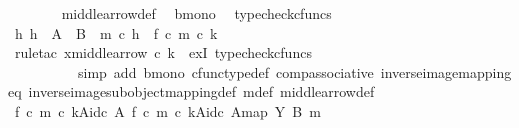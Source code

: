 \begin{isabellebody}
\ \ \ \ \ \ \isamarkupfalse%
\ middle{\isacharunderscore}{\kern0pt}arrow{\isacharunderscore}{\kern0pt}def\ \isamarkupfalse%
\ b{\isacharunderscore}{\kern0pt}mono\ \isamarkupfalse%
\ {\isacharparenleft}{\kern0pt}typecheck{\isacharunderscore}{\kern0pt}cfuncs{\isacharparenright}{\kern0pt}\isanewline
\isanewline
\ \ \ \ \isamarkupfalse%
\ {\isachardoublequoteopen}{\isasymexists}h{\isachardot}{\kern0pt}\ h\ {\isacharcolon}{\kern0pt}\ A\ {\isasymrightarrow}\ B\ {\isasymand}\ m\ {\isasymcirc}\isactrlsub c\ h\ {\isacharequal}{\kern0pt}\ f\ {\isasymcirc}\isactrlsub c\ m{\isacharprime}{\kern0pt}\ {\isasymcirc}\isactrlsub c\ k{\isachardoublequoteclose}\isanewline
\ \ \ \ \ \ \isamarkupfalse%
\ {\isacharparenleft}{\kern0pt}rule{\isacharunderscore}{\kern0pt}tac\ x{\isacharequal}{\kern0pt}{\isachardoublequoteopen}middle{\isacharunderscore}{\kern0pt}arrow\ {\isasymcirc}\isactrlsub c\ k{\isachardoublequoteclose}\ \ exI{\isacharcomma}{\kern0pt}\ typecheck{\isacharunderscore}{\kern0pt}cfuncs{\isacharcomma}{\kern0pt}\ \isanewline
\ \ \ \ \ \ \ \ \ \ simp\ add{\isacharcolon}{\kern0pt}\ b{\isacharunderscore}{\kern0pt}mono\ cfunc{\isacharunderscore}{\kern0pt}type{\isacharunderscore}{\kern0pt}def\ comp{\isacharunderscore}{\kern0pt}associative{}\ inverse{\isacharunderscore}{\kern0pt}image{\isacharunderscore}{\kern0pt}mapping{\isacharunderscore}{\kern0pt}eq\ inverse{\isacharunderscore}{\kern0pt}image{\isacharunderscore}{\kern0pt}subobject{\isacharunderscore}{\kern0pt}mapping{\isacharunderscore}{\kern0pt}def\ m{\isacharprime}{\kern0pt}{\isacharunderscore}{\kern0pt}def\ middle{\isacharunderscore}{\kern0pt}arrow{\isacharunderscore}{\kern0pt}def{\isacharparenright}{\kern0pt}\isanewline
\ \ \isamarkupfalse%
\isanewline
\isanewline
\ \ \isamarkupfalse%
\ \isamarkupfalse%
\ {\isachardoublequoteopen}{\isacharparenleft}{\kern0pt}{\isacharparenleft}{\kern0pt}f\ {\isasymcirc}\isactrlsub c\ m{\isacharprime}{\kern0pt}\ {\isasymcirc}\isactrlsub c\ k{\isacharparenright}{\kern0pt}{\isasymlparr}A{\isasymrparr}\isactrlbsub id\isactrlsub c\ A\isactrlesub {\isacharcomma}{\kern0pt}\ {\isacharbrackleft}{\kern0pt}{\isacharparenleft}{\kern0pt}f\ {\isasymcirc}\isactrlsub c\ m{\isacharprime}{\kern0pt}\ {\isasymcirc}\isactrlsub c\ k{\isacharparenright}{\kern0pt}{\isasymlparr}A{\isasymrparr}\isactrlbsub id\isactrlsub c\ A\isactrlesub {\isacharbrackright}{\kern0pt}map{\isacharparenright}{\kern0pt}\ {\isasymsubseteq}\isactrlbsub Y\isactrlesub \ {\isacharparenleft}{\kern0pt}B{\isacharcomma}{\kern0pt}\ m{\isacharparenright}{\kern0pt}{\isachardoublequoteclose}\isanewline

\end{isabellebody}
